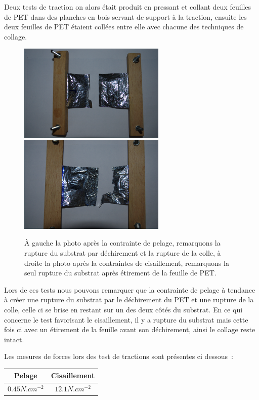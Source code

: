 \documentclass[a4paper,11pt]{article}
\begin{document}
Deux tests de traction on alors était produit en pressant et collant deux feuilles de PET dans des planches en bois servant de support à la traction, ensuite les deux feuilles de PET étaient collées entre elle avec chacune des techniques de collage.

\begin{figure}[H]
	\centering
 \includegraphics[width=7cm]{../Images/test_pelage.png}
 \includegraphics[width=7cm]{../Images/test_cisaillement.png}
 \caption{À gauche la photo après la contrainte de pelage, remarquons la rupture du substrat par déchirement et la rupture de la colle, à droite la photo après la contraintes de cisaillement, remarquons la seul rupture du substrat après étirement de la feuille de PET.}
\end{figure}

Lors de ces tests nous pouvons remarquer que la contrainte de pelage à tendance à créer une rupture du substrat par le déchirement du PET et une rupture de la colle, celle ci se brise en restant sur un des deux côtés du substrat.
En ce qui concerne le test favorisant le cisaillement, il y a rupture du substrat mais cette fois ci avec un étirement de la feuille avant son déchirement, ainsi le collage reste intact.

Les mesures de forces lors des test de tractions sont présentes ci dessous~:

\begin{center}
  \begin{tabular}{|c|c|}
    \hline
    Pelage & Cisaillement \\
    \hline
    $0.45 N.cm^{-2}$ & $12.1 N.cm^{-2}$ \\
    \hline
  \end{tabular}
\end{center}
\end{document}
